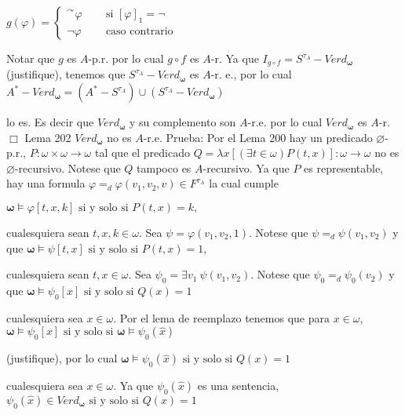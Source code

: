 \(\displaystyle g(\varphi )=\left\{ \begin{array}{ccc} ^{\curvearrowright }\varphi & \;\; & \text{si }\left[ \varphi \right] _{1}=\lnot \\ \lnot \varphi & \;\; & \text{caso contrario} \end{array} \right. \)

Notar que \(g\) es \(A\)-p.r. por lo cual \(g\circ f\) es \(A\)-r. Ya que \(I_{g\circ f}=S^{\tau _{A}}-Verd_{\mathbf{\omega }}\) (justifique), tenemos que \(S^{\tau _{A}}-Verd_{\mathbf{\omega }}\) es \(A\)-r. e., por lo cual
\(\displaystyle A^{\ast }-Verd_{\mathbf{\omega }}=(A^{\ast }-S^{\tau _{A}})\cup (S^{\tau _{A}}-Verd_{\mathbf{\omega }}) \)

lo es. Es decir que \(Verd_{\mathbf{\omega }}\) y su complemento son \(A\)-r.e. por lo cual \(Verd_{\mathbf{\omega }}\) es \(A\)-r. \(\Box\)
Lema 202 \(Verd_{\mathbf{\omega }}\) no es \(A\)-r.e.
Prueba: Por el Lema 200 hay un predicado \(\varnothing \)-p.r., \( P:\omega \times \omega \rightarrow \omega \) tal que el predicado \(Q=\lambda x \left[ (\exists t\in \omega )P(t,x)\right] :\omega \rightarrow \omega \) no es \(\varnothing \)-recursivo. Notese que \(Q\) tampoco es \(A\)-recursivo. Ya que \(P \) es representable, hay una formula \(\varphi =_{d}\varphi (v_{1},v_{2},v)\in F^{\tau _{A}}\) la cual cumple

\(\displaystyle \mathbf{\omega }\models \varphi \left[ t,x,k\right] \text{ si y solo si } P(t,x)=k, \)

cualesquiera sean \(t,x,k\in \omega .\) Sea \(\psi =\varphi (v_{1},v_{2},1)\). Notese que \(\psi =_{d}\psi (v_{1},v_{2})\) y que
\(\displaystyle \mathbf{\omega }\models \psi \left[ t,x\right] \text{ si y solo si }P(t,x)=1 \text{,} \)

cualesquiera sean \(t,x\in \omega .\) Sea \(\psi _{0}=\exists v_{1}\ \psi (v_{1},v_{2})\). Notese que \(\psi _{0}=_{d}\psi _{0}(v_{2})\) y que
\(\displaystyle \mathbf{\omega }\models \psi _{0}\left[ x\right] \text{ si y solo si }Q(x)=1 \)

cualesquiera sea \(x\in \omega \). Por el lema de reemplazo tenemos que para \( x\in \omega \),
\(\displaystyle \mathbf{\omega }\models \psi _{0}\left[ x\right] \text{ si y solo si } \mathbf{\omega }\models \psi _{0}(\widehat{x}) \)

(justifique), por lo cual
\(\displaystyle \mathbf{\omega }\models \psi _{0}(\widehat{x})\text{ si y solo si }Q(x)=1 \)

cualesquiera sea \(x\in \omega \). Ya que \(\psi _{0}(\widehat{x})\) es una sentencia,
\(\displaystyle \psi _{0}(\widehat{x})\in Verd_{\mathbf{\omega }}\text{ si y solo si }Q(x)=1 \)

